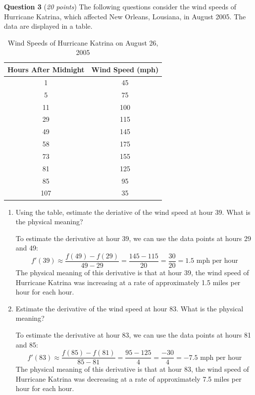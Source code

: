 \documentclass{article}
\begin{document}
\vspace{1cm}
\textbf{Question 3} (\textit{20 points}) The following questions consider the wind speeds of Hurricane Katrina, which affected New Orleans, Lousiana, in August 2005.  The data are displayed in a table.

\begin{table}[htbp]
    \centering
    \caption{Wind Speeds of Hurricane Katrina on August 26, 2005}

    \begin{tabular}{|c|c|}
        \hline
        Hours After Midnight & Wind Speed (mph) \\
        \hline
        1 & 45 \\
        \hline
        5 & 75 \\
        \hline
        11 & 100 \\
        \hline
        29 & 115 \\
        \hline
        49 & 145 \\
        \hline
        58 & 175 \\
        \hline
        73 & 155 \\
        \hline
        81 & 125 \\
        \hline
        85 & 95 \\
        \hline
        107 & 35 \\
        \hline
    \end{tabular}
\end{table}

\begin{enumerate}
    \item Using the table, estimate the deriative of the wind speed at hour 39.  What is the physical meaning?

    To estimate the derivative at hour 39, we can use the data points at hours 29 and 49:
    \[f'(39) \approx \frac{f(49) - f(29)}{49 - 29} = \frac{145 - 115}{20} = \frac{30}{20} = 1.5 \text{ mph per hour}\]
    The physical meaning of this derivative is that at hour 39, the wind speed of Hurricane Katrina was increasing at a rate of approximately 1.5 miles per hour for each hour.

    \item Estimate the derivative of the wind speed at hour 83.  What is the physical meaning?
    
    To estimate the derivative at hour 83, we can use the data points at hours 81 and 85:
    \[f'(83) \approx \frac{f(85) - f(81)}{85 - 81} = \frac{95 - 125}{4} = \frac{-30}{4} = -7.5 \text{ mph per hour}\]       
    The physical meaning of this derivative is that at hour 83, the wind speed of Hurricane Katrina was decreasing at a rate of approximately 7.5 miles per hour for each hour.
\end{enumerate}
\end{document}
